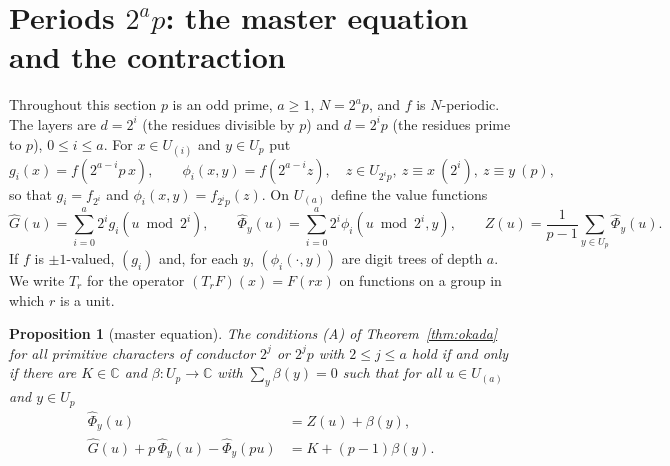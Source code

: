 \documentclass[11pt,a4paper]{article}
\newtheorem{proposition}[theorem]{Proposition}
\theoremstyle{definition}
\theoremstyle{remark}
\newcommand{\C}{\mathbb{C}}
\newcommand{\Ga}{\widehat G}
\newcommand{\Ph}{\widehat\Phi}
\newcommand{\Uu}[1]{U_{(#1)}}
\begin{document}
\section{Periods \texorpdfstring{$2^ap$}{2\^{}a p}: the master equation and the contraction}\label{sec:2ap}

Throughout this section $p$ is an odd prime, $a\ge1$, $N=2^ap$, and $f$ is $N$-periodic. The layers are $d=2^i$ (the residues divisible by $p$) and $d=2^ip$ (the residues prime to $p$), $0\le i\le a$. For $x\in\Uu i$ and $y\in U_p$ put
\[
g_i(x)=f(2^{a-i}p\,x),\qquad \phi_i(x,y)=f(2^{a-i}z),\quad z\in U_{2^ip},\ z\equiv x\ (2^i),\ z\equiv y\ (p),
\]
so that $g_i=f_{2^i}$ and $\phi_i(x,y)=f_{2^ip}(z)$. On $\Uu a$ define the value functions
\[
\Ga(u)=\sum_{i=0}^a2^ig_i(u\bmod2^i),\qquad \Ph_y(u)=\sum_{i=0}^a2^i\phi_i(u\bmod 2^i,y),\qquad Z(u)=\frac1{p-1}\sum_{y\in U_p}\Ph_y(u).
\]
If $f$ is $\pm1$-valued, $(g_i)$ and, for each $y$, $(\phi_i(\cdot,y))$ are digit trees of depth $a$. We write $T_r$ for the operator $(T_rF)(x)=F(rx)$ on functions on a group in which $r$ is a unit.

\begin{proposition}[master equation]\label{prop:master}
The conditions \textup{(A)} of Theorem~\ref{thm:okada} for all primitive characters of conductor $2^j$ or $2^jp$ with $2\le j\le a$ hold if and only if there are $K\in\C$ and $\beta\colon U_p\to\C$ with $\sum_y\beta(y)=0$ such that for all $u\in\Uu a$ and $y\in U_p$
\begin{align}
\Ph_y(u)&=Z(u)+\beta(y),\label{eq:transl}\\
\Ga(u)+p\,\Ph_y(u)-\Ph_y(pu)&=K+(p-1)\beta(y).\label{eq:master}
\end{align}
\end{proposition}
\end{document}
